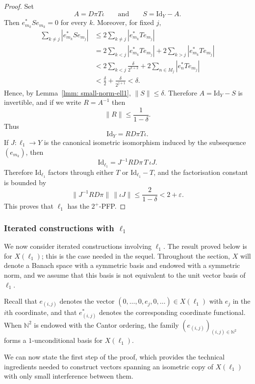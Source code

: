 \documentclass[11pt]{amsart}
\theoremstyle{plain}
\theoremstyle{definition}
\numberwithin{equation}{section}
\newcommand{\norm}[1]{\lVert #1 \rVert}
\newcommand{\Id}{\mathrm{Id}}
\renewcommand{\le}{\leqslant}
\begin{document}
\begin{proof}
    Set
    \[
    A=D\pi T\iota
    \qquad\text{and}\qquad
    S=\Id_Y-A.
    \]
    Then $e_{m_k}^*Se_{m_k}=0$ for every $k$. Moreover, for fixed $j$,
    \begin{align*}
    \sum_{k\neq j}|e_{m_k}^*Se_{m_j}|
    &\le 2\sum_{k\neq j}|e_{m_k}^*Te_{m_j}| \\
    &=2\sum_{k<j}|e_{m_k}^*Te_{m_j}|+2\sum_{k>j}|e_{m_k}^*Te_{m_j}| \\
    &< 2\sum_{k<j}\frac{\delta}{2^{k+2}} + 2\sum_{n\in M_j}|e_n^*Te_{m_j}| \\
    &< \frac\delta2 + \frac\delta{2^{j+1}} < \delta.
    \end{align*}
    Hence, by Lemma~\ref{lmm: small-norm-ell1}, $\norm{S}\le \delta$. Therefore $A=\Id_Y-S$ is invertible, and if we write $R=A^{-1}$ then
    \[
    \norm{R}\le \frac{1}{1-\delta}.
    \]
    Thus
    \[
    \Id_Y=RD\pi T\iota.
    \]
    If $J\colon \ell_1\to Y$ is the canonical isometric isomorphism induced by the subsequence $(e_{m_k})$, then
    \[
    \Id_{\ell_1}=J^{-1}RD\pi\,T\,\iota J.
    \]
    Therefore $\Id_{\ell_1}$ factors through either $T$ or $\Id_{\ell_1}-T$, and the factorisation constant is bounded by
    \[
    \norm{J^{-1}RD\pi}\,\norm{\iota J}
    \le \frac{2}{1-\delta}<2+\varepsilon.
    \]
    This proves that $\ell_1$ has the $2^+$-PFP.
\end{proof}

\subsubsection{Iterated constructions with $\ell_1$}\label{subsec:l_1-iterated}

We now consider iterated constructions involving $\ell_1$. The result proved below is for $X(\ell_1)$; this is the case needed in the sequel. Throughout the section, $X$ will denote a Banach space with a symmetric basis and endowed with a symmetric norm, and we assume that this basis is not equivalent to the unit vector basis of $\ell_1$.

Recall that $e_{(i,j)}$ denotes the vector $(0,\dots,0,e_j,0,\dots)\in X(\ell_1)$ with $e_j$ in the $i$th coordinate, and that $e_{(i,j)}^*$ denotes the corresponding coordinate functional. When $\mathbb N^2$ is endowed with the Cantor ordering, the family $(e_{(i,j)})_{(i,j)\in\mathbb N^2}$ forms a $1$-unconditional basis for $X(\ell_1)$.

We can now state the first step of the proof, which provides the technical ingredients needed to construct vectors spanning an isometric copy of $X(\ell_1)$ with only small interference between them.
\end{document}
